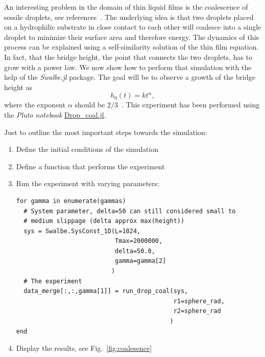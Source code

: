 An interesting problem in the domain of thin liquid films is the coalescence of sessile droplets, see references~\cite{eggers1999coalescence, PhysRevLett.111.144502, PhysRevLett.109.184502, PhysRevLett.95.164503}.
The underlying idea is that two droplets placed on a hydrophilic substrate in close contact to each other will coalesce into a single droplet to minimize their surface area and therefore energy.
The dynamics of this process can be explained using a self-similarity solution of the thin film equation.
In fact, that the bridge height, the point that connects the two droplets, has to grow with a power law.
We now show how to perform that simulation with the help of the \textit{Swalbe.jl} package.
The goal will be to observe a growth of the bridge height as 
\begin{equation}\label{eq:powerlaw}
    h_0(t) = k t^{\alpha},
\end{equation}
where the exponent $\alpha$ should be $2/3$~\cite{pawarSymmetricAsymmetricCoalescence2019, doi:10.1063/1.4824108}.
This experiment has been performed using the \textit{Pluto notebook} \href{https://jugit.fz-juelich.de/compflu/swalbe.jl/-/blob/JOSS/scripts/Drop_coal.jl}{Drop\_coal.jl}.

Just to outline the most important steps towards the simulation:
\begin{enumerate}
\item Define the initial conditions of the simulation
\item Define a function that performs the experiment
\item Run the experiment with varying parameters:
\begin{verbatim}
for gamma in enumerate(gammas)
  # System parameter, delta=50 can still considered small to  
  # medium slippage (delta approx max(height))
  sys = Swalbe.SysConst_1D(L=1024, 
                           Tmax=2000000, 
                           delta=50.0, 
                           gamma=gamma[2]
                          )
  # The experiment
  data_merge[:,:,gamma[1]] = run_drop_coal(sys, 
                                           r1=sphere_rad, 
                                           r2=sphere_rad
                                          )
end
\end{verbatim}
\item Display the results, see Fig.~\ref{fig:coalesence} 
\end{enumerate}

